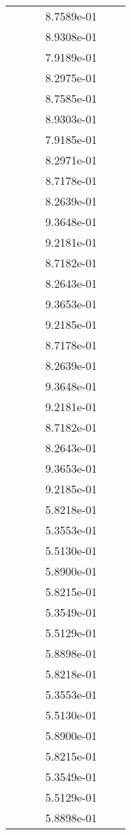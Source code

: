 \begin{xltabular}{\textwidth}{r|rS[table-format=1.3e+2]S[table-format=1.4e+2]S[table-format=1.4e+2]S[table-format=-1.5]}
&  &  & 8.7589e-01 & & \\
&  &  & 8.9308e-01 & & \\
&  &  & 7.9189e-01 & & \\
&  &  & 8.2975e-01 & & \\
&  &  & 8.7585e-01 & & \\
&  &  & 8.9303e-01 & & \\
&  &  & 7.9185e-01 & & \\
&  &  & 8.2971e-01 & & \\
&  &  & 8.7178e-01 & & \\
&  &  & 8.2639e-01 & & \\
&  &  & 9.3648e-01 & & \\
&  &  & 9.2181e-01 & & \\
&  &  & 8.7182e-01 & & \\
&  &  & 8.2643e-01 & & \\
&  &  & 9.3653e-01 & & \\
&  &  & 9.2185e-01 & & \\
&  &  & 8.7178e-01 & & \\
&  &  & 8.2639e-01 & & \\
&  &  & 9.3648e-01 & & \\
&  &  & 9.2181e-01 & & \\
&  &  & 8.7182e-01 & & \\
&  &  & 8.2643e-01 & & \\
&  &  & 9.3653e-01 & & \\
&  &  & 9.2185e-01 & & \\
&  &  & 5.8218e-01 & & \\
&  &  & 5.3553e-01 & & \\
&  &  & 5.5130e-01 & & \\
&  &  & 5.8900e-01 & & \\
&  &  & 5.8215e-01 & & \\
&  &  & 5.3549e-01 & & \\
&  &  & 5.5129e-01 & & \\
&  &  & 5.8898e-01 & & \\
&  &  & 5.8218e-01 & & \\
&  &  & 5.3553e-01 & & \\
&  &  & 5.5130e-01 & & \\
&  &  & 5.8900e-01 & & \\
&  &  & 5.8215e-01 & & \\
&  &  & 5.3549e-01 & & \\
&  &  & 5.5129e-01 & & \\
&  &  & 5.8898e-01 & & \\

\end{xltabular}
